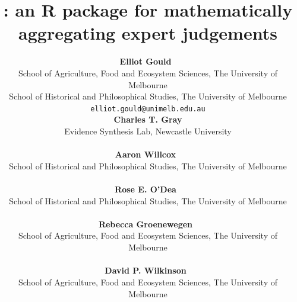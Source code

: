 \documentclass[
  11pt,
  a4paper,
]{article}
\title{\pkg{aggreCAT}: an R package for mathematically aggregating
expert judgements}
\author{
{\bfseries \normalsize Elliot Gould~\orcidlink{0000-0002-6585-538X}}%
 \\%
 \small School of Agriculture, Food and Ecosystem Sciences, The
University of Melbourne \\ \small School of Historical and Philosophical
Studies, The University of Melbourne \\%
{\footnotesize \nolinkurl{elliot.gould@unimelb.edu.au}} \\\vspace{10pt}
{\bfseries \normalsize Charles T. Gray}%
 \\%
 \small Evidence Synthesis Lab, Newcastle University \\%
{\footnotesize \nolinkurl{}} \\\vspace{10pt}
{\bfseries \normalsize Aaron Willcox~\orcidlink{0000-0003-2536-2596}}%
 \\%
 \small School of Historical and Philosophical Studies, The University
of Melbourne \\%
{\footnotesize \nolinkurl{}} \\\vspace{10pt}
{\bfseries \normalsize Rose E. O'Dea~\orcidlink{0000-0001-8177-5075}}%
 \\%
 \small School of Historical and Philosophical Studies, The University
of Melbourne \\%
{\footnotesize \nolinkurl{}} \\\vspace{10pt}
{\bfseries \normalsize Rebecca
Groenewegen~\orcidlink{0000-0001-9177-8536}}%
 \\%
 \small School of Agriculture, Food and Ecosystem Sciences, The
University of Melbourne \\%
{\footnotesize \nolinkurl{}} \\\vspace{10pt}
{\bfseries \normalsize David P.
Wilkinson~\orcidlink{0000-0002-9560-6499}}%
 \\%
 \small School of Agriculture, Food and Ecosystem Sciences, The
University of Melbourne \\%
{\footnotesize \nolinkurl{}} \\\vspace{10pt}
}
\date{}
\newenvironment{keywords}
{\small\sffamily{\sffamily\small\bfseries{Keywords.}}}
\begin{document}
\renewcommand{\abstractname}{Abstract.}


\maketitle
\begin{abstract}
Structured elicitation protocols, such as the IDEA protocol, are used to
elicit probabilistic judgements from multiple domain experts about
uncertain events across fields including ecology, biosecurity risk
assessment, and metascience. Individual expert judgements must
subsequently be mathematically aggregated into a single group forecast.
While the simplest case involves combining a set of point-estimates from
multiple individuals, this process is further complicated when
judgements include uncertainty bounds, or when elicitation is conducted
across multiple rounds. This paper presents , an
open-source  package that provides 29 aggregation methods
for combining individual expert judgements into a single probabilistic
estimate, accommodating designs ranging from single-round point
estimates to multi-round three-point elicitation. The package follows
tidy data principles, enabling straightforward integration with existing
R workflows for application at scale. Methods range from unweighted
arithmetic combinations to performance-weighted schemes and Bayesian
models, with weights derived from uncertainty intervals, shifts in
judgements between elicitation rounds, and breadth of expert reasoning.
We provide worked examples illustrating the mechanics of representative
aggregation methods, a general workflow for batch aggregation across
multiple forecasts and methods, and built-in functions for evaluating
and visualising forecast performance against known outcomes.
 fills a substantive gap in open software for
mathematically aggregating expert judgement, and is intended to support
researchers and decision analysts in rapidly and rigorously synthesising
outputs from structured elicitation exercises.
\end{abstract}
\begin{keywords}
\def\sep{;\ }
mathematical aggregation\sep expert judgement\sep replicability\sep 
R
\end{keywords}


\section{Introduction}\label{sec-introduction}
\end{document}
